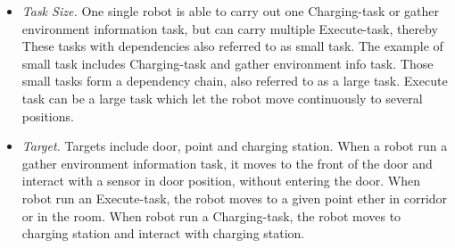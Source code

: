 \begin{table}[htb]
\centering
{}
\caption{Task arributes part 1}
\label{tab:task_attributes_difference}
\end{table}

\begin{table}[htb]
\centering
{}
\caption{Task attributes part 2}
\label{tab:task_attributes_common}
\end{table}


\begin{table}[htb]
\centering
{}
\caption{Task Table in Database}
\label{tab:task_table}
\end{table}

\begin{itemize}
	\item \textsl{Task Size.} One single robot is able to carry out one Charging-task or gather environment information task, but can carry multiple Execute-task, thereby 
	These tasks with dependencies also referred to as small task. The example of small task includes Charging-task and gather environment info task. 
	Those small tasks form a dependency chain, also referred to as a large task. Execute task can be a large task which let the robot move continuously to several positions.
	\item \textsl{Target.} Targets include door, point and charging station. When a robot run a gather environment information task, it moves to the front of the door and interact with a sensor in door position, without entering the door. 
	When robot run an Execute-task, the robot moves to a given point ether in corridor or in the room.
	When robot run a Charging-task, the robot moves to charging station and interact with charging station.
\end{itemize}

